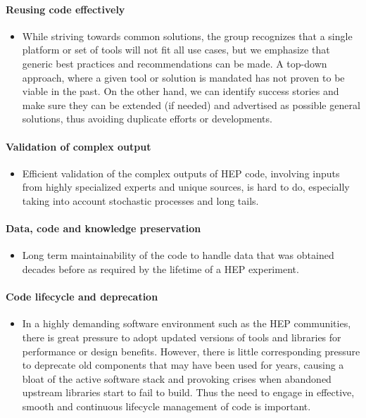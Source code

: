 \documentclass[12pt,a4paper]{article}
\begin{document}
\paragraph{Reusing code effectively}

\begin{itemize}
\item
    While striving towards common solutions, the group recognizes that a
  single platform or set of tools will not fit all use cases, but we
  emphasize that generic best practices and recommendations can be made.
  A top-down approach, where a given tool or solution is mandated has
  not proven to be viable in the past. On the other hand, we can
  identify success stories and make sure they can be extended (if
  needed) and advertised as possible general solutions, thus avoiding
  duplicate efforts or developments.
\end{itemize}

\paragraph{Validation of complex output}

\begin{itemize}
\item
    Efficient validation of the complex outputs of HEP code, involving
  inputs from highly specialized experts and unique sources, is hard to
  do, especially taking into account stochastic processes and long
  tails.
\end{itemize}

\paragraph{Data, code and knowledge preservation}

\begin{itemize}
\item
    Long term maintainability of the code to handle data that was obtained
  decades before as required by the lifetime of a HEP experiment.
\end{itemize}

\paragraph{Code lifecycle and deprecation}

\begin{itemize}
\item
    In a highly demanding software environment such as the HEP
  communities, there is great pressure to adopt updated versions of
  tools and libraries for performance or design benefits. However, there
  is little corresponding pressure to deprecate old components that may
  have been used for years, causing a bloat of the active software stack
  and provoking crises when abandoned upstream libraries start to fail
  to build. Thus the need to engage in effective, smooth and continuous
  lifecycle management of code is important.
\end{itemize}
\end{document}
